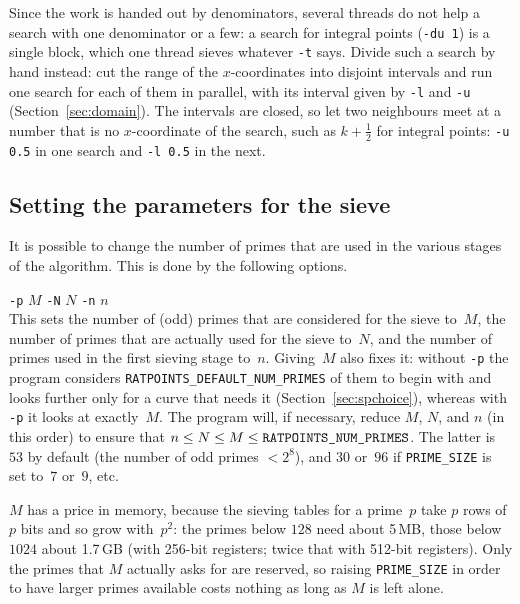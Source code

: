 \documentclass[12pt,a4paper,oneside]{amsart}
\begin{document}
Since the work is handed out by denominators, several threads do not help
a search with one denominator or a few: a search for integral points
(\verb+-du 1+) is a single block, which one thread sieves whatever
\verb+-t+ says. Divide such a search by hand instead: cut the range of the
$x$-coordinates into disjoint intervals and run one search for each of
them in parallel, with its interval given by \verb+-l+ and \verb+-u+
(Section~\ref{sec:domain}). The intervals are closed, so let two
neighbours meet at a number that is no $x$-coordinate of the search, such
as $k + \frac12$ for integral points: \verb+-u 0.5+ in one search and
\verb+-l 0.5+ in the next.

\subsection{Setting the parameters for the sieve} \label{fd}

It is possible to change the number of primes that are used in the various
stages of the algorithm. This is done by the following options. \\
\strut\quad\verb+-p+ $M$ \verb+-N+ $N$ \verb+-n+ $n$ \\
This sets the number of (odd) primes that are considered for the sieve
to~$M$, the number of primes that are actually used for the sieve to~$N$,
and the number of primes used in the first sieving stage to~$n$. Giving~$M$
also fixes it: without \verb+-p+ the program considers
\texttt{RATPOINTS\_DEFAULT\_NUM\_PRIMES} of them to begin with and looks
further only for a curve that needs it (Section~\ref{sec:spchoice}), whereas
with \verb+-p+ it looks at exactly~$M$. The program
will, if necessary, reduce $M$, $N$, and $n$ (in this order) to ensure
that $n \le N \le M \le \text{\texttt{RATPOINTS\_NUM\_PRIMES}}$. The latter
is $53$ by default (the number of odd primes $< 2^8$), and $30$ or~$96$ if
\texttt{PRIME\_SIZE} is set to~$7$ or~$9$, etc.

$M$ has a price in memory, because the sieving tables for a prime~$p$ take
$p$ rows of $p$ bits and so grow with~$p^2$: the primes below $128$ need about
5\,MB, those below $1024$ about 1.7\,GB (with 256-bit registers;
twice that with 512-bit registers).
Only the primes that $M$ actually asks for are reserved, so raising
\texttt{PRIME\_SIZE} in order to have larger primes available costs nothing as
long as $M$ is left alone.
\end{document}

